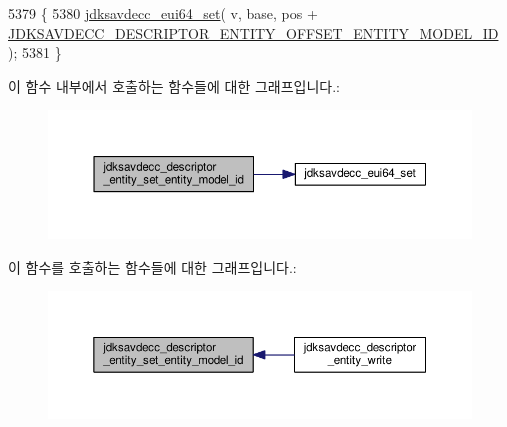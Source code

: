 \begin{DoxyCode}
5379 \{
5380     \hyperlink{group__eui64_ga1c5b342315464ff77cbc7d587765432d}{jdksavdecc\_eui64\_set}( v, base, pos + 
      \hyperlink{group__descriptor__entity_ga1801944034d2a89b6fb4dee8a52763a7}{JDKSAVDECC\_DESCRIPTOR\_ENTITY\_OFFSET\_ENTITY\_MODEL\_ID} );
5381 \}
\end{DoxyCode}


이 함수 내부에서 호출하는 함수들에 대한 그래프입니다.\+:
\nopagebreak
\begin{figure}[H]
\begin{center}
\leavevmode
\includegraphics[width=350pt]{group__descriptor__entity_ga69134d2205dee17b6ba7dd87ef1d5a5f_cgraph}
\end{center}
\end{figure}




이 함수를 호출하는 함수들에 대한 그래프입니다.\+:
\nopagebreak
\begin{figure}[H]
\begin{center}
\leavevmode
\includegraphics[width=350pt]{group__descriptor__entity_ga69134d2205dee17b6ba7dd87ef1d5a5f_icgraph}
\end{center}
\end{figure}



